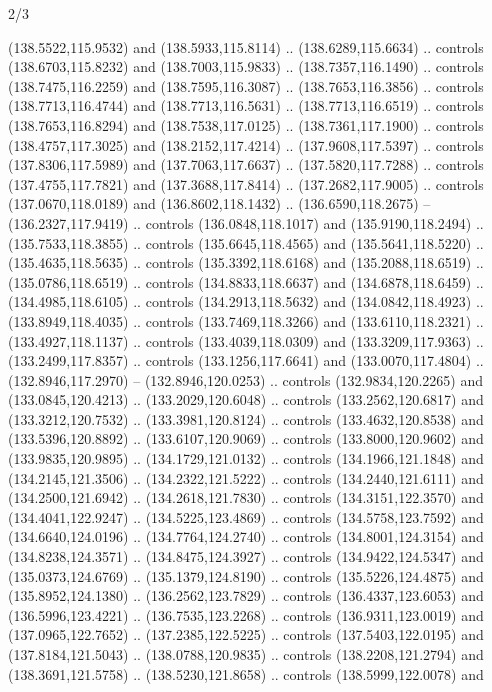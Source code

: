 \begin{flagdescription}{2/3}
\begin{scope}[shift={(0.5\flaglength,0.5)},scale=\flagwidth/320]
\begin{scope}[y=0.8pt, x=0.8pt, yscale=-1,shift={(-118.3,-146)}]
  (138.5522,115.9532) and (138.5933,115.8114) .. (138.6289,115.6634) .. controls
  (138.6703,115.8232) and (138.7003,115.9833) .. (138.7357,116.1490) .. controls
  (138.7475,116.2259) and (138.7595,116.3087) .. (138.7653,116.3856) .. controls
  (138.7713,116.4744) and (138.7713,116.5631) .. (138.7713,116.6519) .. controls
  (138.7653,116.8294) and (138.7538,117.0125) .. (138.7361,117.1900) .. controls
  (138.4757,117.3025) and (138.2152,117.4214) .. (137.9608,117.5397) .. controls
  (137.8306,117.5989) and (137.7063,117.6637) .. (137.5820,117.7288) .. controls
  (137.4755,117.7821) and (137.3688,117.8414) .. (137.2682,117.9005) .. controls
  (137.0670,118.0189) and (136.8602,118.1432) .. (136.6590,118.2675) --
  (136.2327,117.9419) .. controls (136.0848,118.1017) and (135.9190,118.2494) ..
  (135.7533,118.3855) .. controls (135.6645,118.4565) and (135.5641,118.5220) ..
  (135.4635,118.5635) .. controls (135.3392,118.6168) and (135.2088,118.6519) ..
  (135.0786,118.6519) .. controls (134.8833,118.6637) and (134.6878,118.6459) ..
  (134.4985,118.6105) .. controls (134.2913,118.5632) and (134.0842,118.4923) ..
  (133.8949,118.4035) .. controls (133.7469,118.3266) and (133.6110,118.2321) ..
  (133.4927,118.1137) .. controls (133.4039,118.0309) and (133.3209,117.9363) ..
  (133.2499,117.8357) .. controls (133.1256,117.6641) and (133.0070,117.4804) ..
  (132.8946,117.2970) -- (132.8946,120.0253) .. controls (132.9834,120.2265) and
  (133.0845,120.4213) .. (133.2029,120.6048) .. controls (133.2562,120.6817) and
  (133.3212,120.7532) .. (133.3981,120.8124) .. controls (133.4632,120.8538) and
  (133.5396,120.8892) .. (133.6107,120.9069) .. controls (133.8000,120.9602) and
  (133.9835,120.9895) .. (134.1729,121.0132) .. controls (134.1966,121.1848) and
  (134.2145,121.3506) .. (134.2322,121.5222) .. controls (134.2440,121.6111) and
  (134.2500,121.6942) .. (134.2618,121.7830) .. controls (134.3151,122.3570) and
  (134.4041,122.9247) .. (134.5225,123.4869) .. controls (134.5758,123.7592) and
  (134.6640,124.0196) .. (134.7764,124.2740) .. controls (134.8001,124.3154) and
  (134.8238,124.3571) .. (134.8475,124.3927) .. controls (134.9422,124.5347) and
  (135.0373,124.6769) .. (135.1379,124.8190) .. controls (135.5226,124.4875) and
  (135.8952,124.1380) .. (136.2562,123.7829) .. controls (136.4337,123.6053) and
  (136.5996,123.4221) .. (136.7535,123.2268) .. controls (136.9311,123.0019) and
  (137.0965,122.7652) .. (137.2385,122.5225) .. controls (137.5403,122.0195) and
  (137.8184,121.5043) .. (138.0788,120.9835) .. controls (138.2208,121.2794) and
  (138.3691,121.5758) .. (138.5230,121.8658) .. controls (138.5999,122.0078) and

\end{scope}
\end{scope}
\end{flagdescription}
